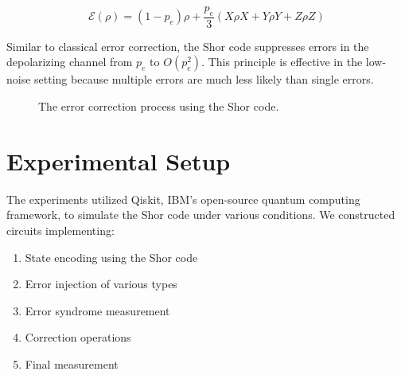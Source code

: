 \documentclass[12pt,a4paper]{article}
\begin{document}
\begin{equation}
\mathcal{E}(\rho) = (1-p_e)\rho + \frac{p_e}{3}(X\rho X + Y\rho Y + Z\rho Z)
\end{equation}

Similar to classical error correction, the Shor code suppresses errors in the depolarizing channel from $p_e$ to $O(p^2_e)$. This principle is effective in the low-noise setting because multiple errors are much less likely than single errors.

\begin{figure}[H]
    \centering
    \caption{The error correction process using the Shor code.}
    \label{fig:error_correction_process}
\end{figure}

\section{Experimental Setup}

The experiments utilized Qiskit, IBM's open-source quantum computing framework, to simulate the Shor code under various conditions. We constructed circuits implementing:

\begin{enumerate}
    \item State encoding using the Shor code
    \item Error injection of various types
    \item Error syndrome measurement
    \item Correction operations
    \item Final measurement
\end{enumerate}
\end{document}
